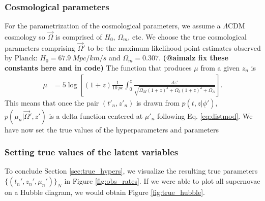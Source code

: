 \documentclass[12pt, onecolumn]{emulateapj}
\newcommand{\textul}{\underline}
\begin{document}
\subsubsection{Cosmological parameters}
\label{sec:cosmohypers}

For the parametrization of the cosmological parameters, we assume a $\Lambda$CDM cosmology so $\vec{\Omega}$ is comprised of $H_{0}$, $\Omega_{m}$, etc.  We choose the true cosmological parameters comprising $\vec{\Omega}'$ to be the maximum likelihood point estimates observed by Planck: $H_{0}=67.9\ Mpc/km/s$ and $\Omega_{m}=0.307$.  \textbf{(@aimalz fix these constants here and in code)}  The function that produces $\mu$ from a given $z_{n}$ is 
\begin{align}
\label{eq:distmod}
\mu &= 5\log\left[(1+z)\frac{1}{10\ pc}\int_{0}^{z}\frac{dz'}{\sqrt{\Omega_{M}(1+z)^{3}+\Omega_{k}(1+z)^{2}+\Omega_{\Lambda}}}\right].
\end{align}
This means that once the pair $(t'_{n}, z'_{n})$ is drawn from $p(t, z | \textul{\phi}')$, $p(\mu_{n} | \vec{\Omega}', z')$ is a delta function centered at $\mu'_{n}$ following Eq. \ref{eq:distmod}.  We have now set the true values of the hyperparameters and parameters

 
\subsubsection{Setting true values of the latent variables}
\label{sec:drawmock}

To conclude Section \ref{sec:true_hypers}, we visualize the resulting true parameters $\{(t_{n}', z_{n}', \mu_{n}')\}_{N}$ in Figure \ref{fig:obs_rates}.  If we were able to plot all supernovae on a Hubble diagram, we would obtain Figure \ref{fig:true_hubble}.
\end{document}
